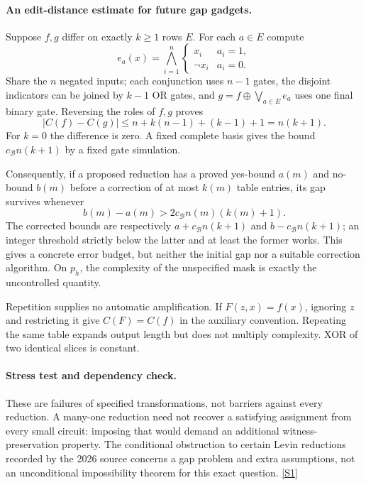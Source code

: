 \documentclass[11pt,a4paper]{article}
\newcommand{\sref}[2]{\hyperlink{source:#1:#2}{[S#2]}}
\numberwithin{equation}{section}
\begin{document}
\paragraph{An edit-distance estimate for future gap gadgets.}
Suppose $f,g$ differ on exactly $k\ge1$ rows $E$. For each $a\in E$ compute
\[
 e_a(x)=\bigwedge_{i=1}^n
 \begin{cases}x_i&a_i=1,\\ \neg x_i&a_i=0.
 \end{cases}
\]
Share the $n$ negated inputs; each conjunction uses $n-1$ gates, the disjoint
indicators can be joined by $k-1$ OR gates, and
$g=f\mathbin{\oplus}\bigvee_{a\in E}e_a$ uses one final binary gate.
Reversing the roles of $f,g$ proves
\begin{equation}\label{statement:edit}
 |C(f)-C(g)|\le n+k(n-1)+(k-1)+1=n(k+1).
\end{equation}
For $k=0$ the difference is zero. A fixed complete basis gives the bound
$c_{\mathcal B}n(k+1)$ by a fixed gate simulation.

Consequently, if a proposed reduction has a proved yes-bound $a(m)$ and
no-bound $b(m)$ before a correction of at most $k(m)$ table entries, its gap
survives whenever
\[
 b(m)-a(m)>2c_{\mathcal B}n(m)(k(m)+1).
\]
The corrected bounds are respectively $a+c_{\mathcal B}n(k+1)$ and
$b-c_{\mathcal B}n(k+1)$; an integer threshold strictly below the latter
and at least the former works. This gives a concrete error budget, but
neither the initial gap nor a suitable correction algorithm. On $p_h$, the
complexity of the unspecified mask is exactly the uncontrolled quantity.

Repetition supplies no automatic amplification. If $F(z,x)=f(x)$, ignoring
$z$ and restricting it give $C(F)=C(f)$ in the auxiliary convention.
Repeating the same table expands output length but does not multiply
complexity. XOR of two identical slices is constant.

\paragraph{Stress test and dependency check.}
These are failures of specified transformations, not barriers against every
reduction. A many-one reduction need not recover a satisfying assignment
from every small circuit: imposing that would demand an additional
witness-preservation property. The conditional obstruction to certain Levin
reductions recorded by the 2026 source concerns a gap problem and extra
assumptions, not an unconditional impossibility theorem for this exact
question. \sref{statement}{1}
\end{document}
